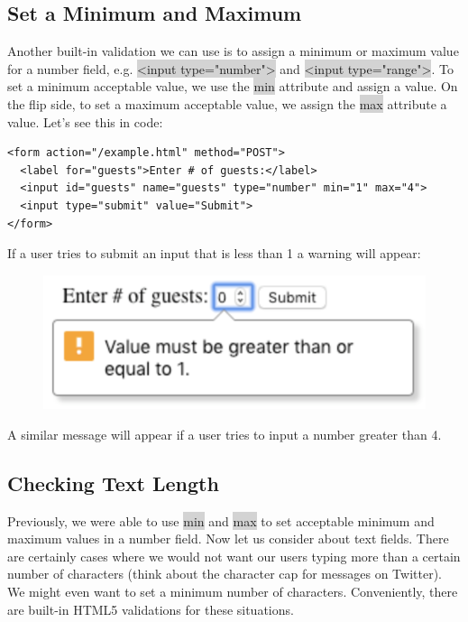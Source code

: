 \documentclass[11pt]{article}
\begin{document}
\subsection{Set a Minimum and Maximum}
Another built-in validation we can use is to assign a minimum or maximum value for a number field, e.g. \colorbox{lightgray}{<input type="number">} and \colorbox{lightgray}{<input type="range">}. To set a minimum acceptable value, we use the \colorbox{lightgray}{min} attribute and assign a value. On the flip side, to set a maximum acceptable value, we assign the \colorbox{lightgray}{max} attribute a value. Let’s see this in code:
\begin{lstlisting}
<form action="/example.html" method="POST">
  <label for="guests">Enter # of guests:</label>
  <input id="guests" name="guests" type="number" min="1" max="4">
  <input type="submit" value="Submit">
</form>
\end{lstlisting}
If a user tries to submit an input that is less than 1 a warning will appear:
\begin{figure}[H]
\includegraphics[scale = 0.7]{5_2}
\centering
\end{figure}
\vspace{-4mm}
A similar message will appear if a user tries to input a number greater than 4. 

\subsection{Checking Text Length}
Previously, we were able to use \colorbox{lightgray}{min} and \colorbox{lightgray}{max} to set acceptable minimum and maximum values in a number field. Now let us consider about text fields. There are certainly cases where we would not want our users typing more than a certain number of characters (think about the character cap for messages on Twitter). We might even want to set a minimum number of characters. Conveniently, there are built-in HTML5 validations for these situations.
\end{document}
